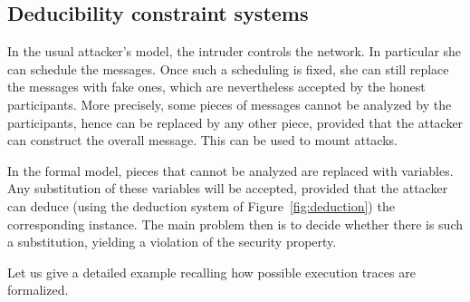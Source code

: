 \documentclass[acmtocl,acmnow]{acmtrans2m}
\newcommand{\Dedsyss}[1]{Deducibility constraint systems}
\begin{document}
\subsection{\Dedsyss{}}\label{sec:systems}

In the usual attacker's model, the intruder controls the network. In particular
she can schedule the messages. Once such a scheduling is fixed, she can
still replace the messages with fake ones, which are nevertheless accepted
by the honest participants. More precisely, some pieces of messages
cannot be analyzed by the participants, hence can be replaced by any
other piece, provided that the attacker can construct the overall message. 
This can be used to mount attacks. 

In the formal model, pieces that cannot be analyzed are replaced with variables.
Any substitution of these variables will be accepted, provided that the
attacker can deduce (using the deduction system of Figure~\ref{fig:deduction})
the corresponding instance. The main problem then is to decide whether
there is such a substitution, yielding a violation of the security property.

Let us give a detailed example recalling how possible execution traces are
formalized.
\end{document}
